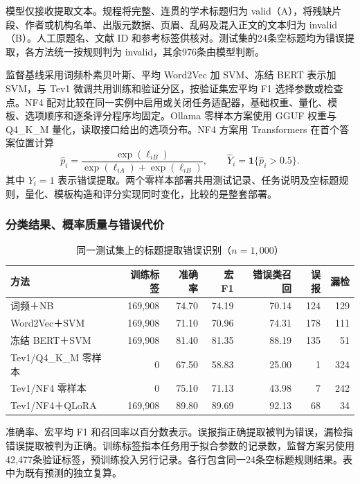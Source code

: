 \documentclass[UTF8,a4paper,zihao=-4,fontset=fandol]{ctexart}
\newcommand{\ind}{\mathbf 1}
\begin{document}
模型仅接收提取文本。规程将完整、连贯的学术标题归为 valid（A），将残缺片段、作者或机构名单、出版元数据、页眉、乱码及混入正文的文本归为 invalid（B）。人工原题名、文献 ID 和参考标签供核对。测试集的24条空标题均为错误提取，各方法统一按规则判为 invalid，其余976条由模型判断。

监督基线采用词频朴素贝叶斯、平均 Word2Vec 加 SVM、冻结 BERT 表示加 SVM，与 Tev1 微调共用训练和验证分区，按验证集宏平均 F1 选择参数或检查点。NF4 配对比较在同一实例中启用或关闭任务适配器，基础权重、量化、模板、选项顺序和逐条评分程序均固定。Ollama 零样本方案使用 GGUF 权重与 Q4\_K\_M 量化，读取接口给出的选项分布。NF4 方案用 Transformers 在首个答案位置计算
\begin{equation}
 \widehat p_i=\frac{\exp(\ell_{iB})}{\exp(\ell_{iA})+\exp(\ell_{iB})},\qquad
 \widehat Y_i=\ind\{\widehat p_i>0.5\}.
 \label{eq:title-probability}
\end{equation}
其中 $Y_i=1$ 表示错误提取。两个零样本部署共用测试记录、任务说明及空标题规则，量化、模板构造和评分实现同时变化，比较的是整套部署。

\subsubsection{分类结果、概率质量与错误代价}

\begin{table}[!htbp]
\centering\small
\caption{同一测试集上的标题提取错误识别（$n=1{,}000$）}\label{tab:title-results}
\begin{tabularx}{\textwidth}{@{}Yrrrrrr@{}}
\toprule
方法 & 训练标签 & 准确率 & 宏 F1 & 错误类召回 & 误报 & 漏检 \\
\midrule
词频＋NB & 169,908 & 74.70 & 74.19 & 70.14 & 124 & 129 \\
Word2Vec＋SVM & 169,908 & 71.10 & 70.96 & 74.31 & 178 & 111 \\
冻结 BERT＋SVM & 169,908 & 81.40 & 81.35 & 88.19 & 135 & 51 \\
Tev1/Q4\_K\_M 零样本 & 0 & 67.50 & 58.83 & 25.00 & 1 & 324 \\
Tev1/NF4 零样本 & 0 & 75.10 & 71.13 & 43.98 & 7 & 242 \\
Tev1/NF4＋QLoRA & 169,908 & 89.80 & 89.69 & 92.13 & 68 & 34 \\
\bottomrule
\end{tabularx}
\vspace{0.35em}
\parbox{\textwidth}{\footnotesize 准确率、宏平均 F1 和召回率以百分数表示。误报指正确提取被判为错误，漏检指错误提取被判为正确。训练标签指本任务用于拟合参数的记录数，监督方案另使用42,477条验证标签，预训练投入另行记录。各行包含同一24条空标题规则结果。表中为既有预测的独立复算。}
\end{table}
\FloatBarrier
\end{document}
